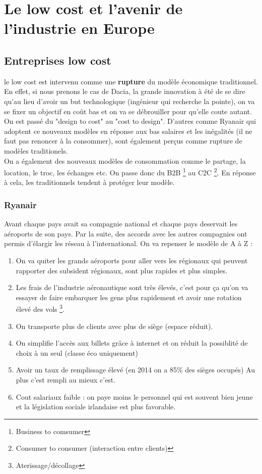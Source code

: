 
\chapter{Le low cost et l'avenir de l'industrie en Europe}
\section{Entreprises low cost}
le low cost est intervenu comme une \textbf{rupture} du modèle économique traditionnel. En effet, si nous prenons le cas de Dacia, la grande innovation à été de se dire qu’au lieu d’avoir un but technologique (ingénieur qui recherche la pointe), on va se fixer un objectif en coût bas et on va se débrouiller pour qu’elle coute autant. On est passé du "design to cost" au "cost to design". D'autres comme Ryanair qui adoptent ce nouveaux modèles en réponse aux bas salaires et les inégalités (il ne faut pas renoncer à la consommer), sont également perçus comme rupture de modèles traditionels. \\
On a également des nouveaux modèles de consommation comme le partage, la location, le troc, les échanges etc. On passe donc du B2B \footnote{Business to comsumer} au C2C \footnote{Consumer to consumer (interaction entre clients)}. En réponse à cela, les traditionnels tendent à protéger leur modèle. 

\subsection{Ryanair}
Avant chaque pays avait sa compagnie national et chaque pays deservait les aéroports de son pays. Par la suite, des accords avec les autres compagnies ont permis d'élargir les réseau à l'international.
On va repenser le modèle de A à Z :
\begin{enumerate}
	\item On va quiter les grands aéroports pour aller vers les régionaux qui peuvent rapporter des subsident régionaux, sont plus rapides et plus simples.
	      	
	\item Les frais de l’industrie aéronautique sont très élevés, c’est pour ça qu’on va essayer de faire embarquer les gens plus rapidement et avoir une rotation élevé des vols \footnote{Aterissage/décollage}.
	      	
	\item On transporte plus de clients avec plus de siège (espace réduit).
	      	
	\item On simplifie l’accès aux billets grâce à internet et on réduit la possiblité de choix à un seul (classe éco uniquement)
	      	
	\item Avoir un taux de remplissage élevé (en 2014 on a 85\% des sièges occupés) Au plus c’est rempli au mieux c’est.
	      	
	\item Cout salariaux faible : on paye moins le personnel qui est souvent bien jeune et la législation sociale irlandaise est plus favorable.
\end{enumerate}

